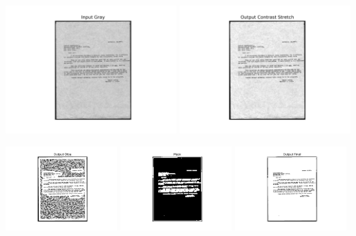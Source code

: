 \documentclass[titlepage]{article}
\begin{document}
\begin{center}
\includegraphics[width=0.49\textwidth]{img_9_gray.png}
\includegraphics[width=0.49\textwidth]{img_9_output_cont.png}
\end{center}

\begin{center}
\includegraphics[width=0.32\textwidth]{img_9_output_otsu.png}
\includegraphics[width=0.32\textwidth]{img_9_mask.png}
\includegraphics[width=0.32\textwidth]{img_9_output_final.png}
\end{center}
\end{document}
